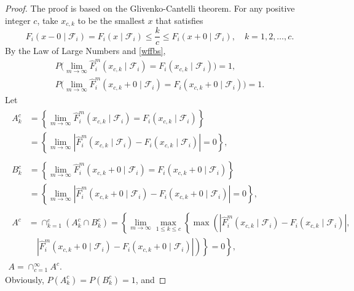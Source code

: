 \documentclass[reqno]{amsart}
\begin{document}
\begin{proof}
The proof is based on the Glivenko-Cantelli theorem. For any positive integer $c$, 
take $x_{c, k}$ to be the smallest $x$ that satisfies
\[
 F_i\left(x-0\mid \mathcal{F}_i \right)=F_i\left(x\mid \mathcal{F}_i \right) 
 \leq \frac{k}{c} \leq F_i\left(x+0\mid \mathcal{F}_i \right), \quad k=1,2, \dots, c.
\]
By the Law of Large Numbers and \eqref{wffbs},
\begin{gather*}
 P\Big(\lim _{m \to \infty} \hat{F}_i^m(x_{c, k}\mid \mathcal{F}_i )
 =F_i(x_{c, k}\mid \mathcal{F}_i)\Big)=1,
\\
 P\Big(\lim _{m \to \infty}\hat{F}_i^m\left(x_{c, k}+0\mid \mathcal{F}_i \right)
 =F_i\left(x_{c, k}+0\mid \mathcal{F}_i\right)\Big)=1.
\end{gather*}
Let
\begin{gather*}
 \begin{aligned}
A_k^c & =\left\{\lim _{m \to \infty} \hat{F}_i^m\left(x_{c, k}\mid \mathcal{F}_i \right)=F_i\left(x_{c, k}\mid \mathcal{F}_i\right)\right\}\\
&=\left\{\lim _{m \to \infty}\left|\hat{F}_i^m\left(x_{c, k}\mid \mathcal{F}_i 
\right)-F_i\left(x_{c, k}\mid \mathcal{F}_i\right)\right|=0\right\},
\end{aligned} \\
\begin{aligned}
B_k^c & =\left\{\lim _{m \to \infty} \hat{F}_i^m\left(x_{c, k}+0\mid \mathcal{F}_i \right)=F_i\left(x_{c, k}+0\mid \mathcal{F}_i\right)\right\} \\
& =\left\{\lim _{m \to \infty}\left|\hat{F}_i^m\left(x_{c, k}+0\mid \mathcal{F}_i 
\right)-F_i\left(x_{c, k}+0\mid \mathcal{F}_i\right)\right|=0\right\} ,
\end{aligned}\\
\begin{aligned}
A^c & =\cap_{k=1}^c\left(A_k^c \cap B_k^c\right)=\left\{\lim_{ m\to \infty } \max_{ 1 \leq k \leq c } \left\{\max \left(\left|\hat{F}_i^m\left(x_{c, k}\mid \mathcal{F}_i \right)-F_i\left(x_{c, k}\mid \mathcal{F}_i\right)\right|,\right.\right.\right. \\
&\quad \left.\left.\left.\left|\hat{F}_i^m\left(x_{c, k}+0\mid \mathcal{F}_i 
\right)-F_i\left(x_{c, k}+0\mid \mathcal{F}_i\right)\right|\right)\right\}=0\right\} ,
\end{aligned}\\
A =\cap_{c=1}^{\infty} A^c.
\end{gather*}
Obviously, $P\left(A_k^c\right)=P\left(B_k^c\right)=1$, and

\end{proof}
\end{document}
